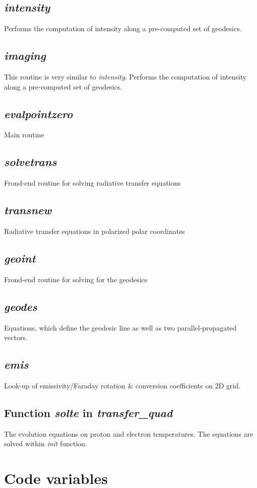 \documentclass{emulateapj}
\begin{document}
\subsection{\textit{intensity}}
Performs the computation of intensity along a pre-computed set of geodesics.
\subsection{\textit{imaging}}
This routine is very similar to \textit{intensity}.
Performs the computation of intensity along a pre-computed set of geodesics.
\subsection{\textit{evalpointzero}}
Main routine
\subsection{\textit{solvetrans}}
Frond-end routine for solving radiative transfer equations
\subsection{\textit{transnew}}
Radiative transfer equations in polarized polar coordinates
\subsection{\textit{geoint}}
Frond-end routine for solving for the geodesics
\subsection{\textit{geodes}}
Equations, which define the geodesic line as well as two parallel-propagated vectors.
\subsection{\textit{emis}}
Look-up of emissivity/Faraday rotation \& conversion coefficients on 2D grid.
\subsection{Function \textit{solte} in \textit{transfer\_quad}}
The evolution equations on proton and electron temperatures. The equations are solved within \textit{init} function.

\section{Code variables}
\end{document}
